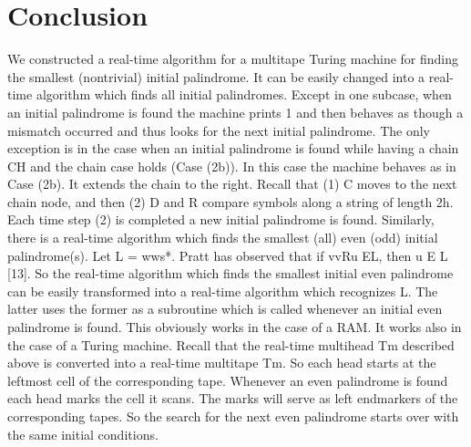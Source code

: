 \documentclass[11pt,a4paper]{report}
\begin{document}
\chapter{Conclusion}

We constructed a real-time algorithm for a multitape Turing machine for finding the
smallest (nontrivial) initial palindrome. It can be easily changed into a real-time algorithm
which finds all initial palindromes. Except in one subcase, when an initial palindrome is
found the machine prints 1 and then behaves as though a mismatch occurred and thus
looks for the next initial palindrome. The only exception is in the case when an initial
palindrome is found while having a chain CH and the chain case holds (Case (2b)).
In this case the machine behaves as in Case (2b). It extends the chain to the right. Recall
that (1) C moves to the next chain node, and then (2) D and R compare symbols along a
string of length 2h. Each time step (2) is completed a new initial palindrome is found.
Similarly, there is a real-time algorithm which finds the smallest (all) even (odd) initial
palindrome(s).
Let L = {wws}*. Pratt has observed that if vvRu EL, then u E L [13]. So the real-time
algorithm which finds the smallest initial even palindrome can be easily transformed into
a real-time algorithm which recognizes L. The latter uses the former as a subroutine 
which is called whenever an initial even palindrome is found. This obviously works in
the case of a RAM. It works also in the case of a Turing machine. Recall that the real-time
multihead Tm described above is converted into a real-time multitape Tm. So each
head starts at the leftmost cell of the corresponding tape. Whenever an even palindrome is
found each head marks the cell it scans. The marks will serve as left endmarkers of the
corresponding tapes. So the search for the next even palindrome starts over with the same
initial conditions. 


\end{document}
